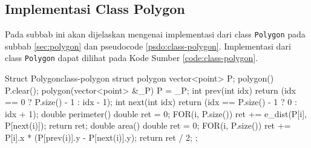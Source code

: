 \subsection{Implementasi Class Polygon}
Pada subbab ini akan dijelaskan mengenai implementasi dari class \texttt{Polygon} pada subbab \ref{sec:polygon} dan pseudocode \ref{psdo:class-polygon}. Implementasi dari class \texttt{Polygon} dapat dilihat pada Kode Sumber \ref{code:class-polygon}.

\begin{code}[firstnumber=1]{Struct Polygon}{class-polygon}
struct polygon{
	vector<point> P;
	polygon(){
		P.clear();
	}
	polygon(vector<point> &_P){
		P = _P;
	}
	int prev(int idx){
		return (idx == 0 ? P.size() - 1 : idx - 1);
	}
	int next(int idx){
		return (idx == P.size() - 1 ? 0 : idx + 1);
	}
	double perimeter(){
		double ret = 0;
		FOR(i, P.size()){
			ret += e_dist(P[i], P[next(i)]);
		}
		return ret;
	}
	double area(){
		double ret = 0;
		FOR(i, P.size()){
			ret += P[i].x * (P[prev(i)].y - P[next(i)].y);
		}
		return ret / 2;
	}
};
\end{code}
